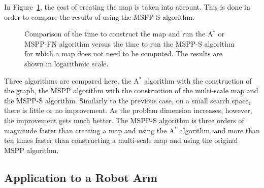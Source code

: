 \documentclass[letterpaper, 10 pt, conference]{ieeeconf}
\theoremstyle{definition}
\begin{document}
In Figure~\ref{comparison2}, the cost of creating the map is taken into account. This is done in order
to compare the results of using the MSPP-S algorithm.
\begin{figure}[ht]
\centering
{} \caption{Comparison of the time to construct the map and run the A$^*$ or MSPP-FN algorithm versus the time to run the MSPP-S algorithm for which a map does not need to be computed. The results are shown in logarithmic scale.}
\label{comparison2}
\end{figure}
Three algorithms are compared here, the A$^*$ algorithm with the construction of the graph, the MSPP algorithm with the construction of the multi-scale map and the MSPP-S algorithm.
Similarly to the previous case, on a small search space, there is little or no improvement.
As the problem dimension increases, however, the improvement gets much better.
The MSPP-S algorithm is three orders of magnitude faster than creating a map and using the A$^*$ algorithm, and more than ten times faster than constructing a multi-scale map and using the original MSPP algorithm.

\subsection{Application to a Robot Arm}
\end{document}
